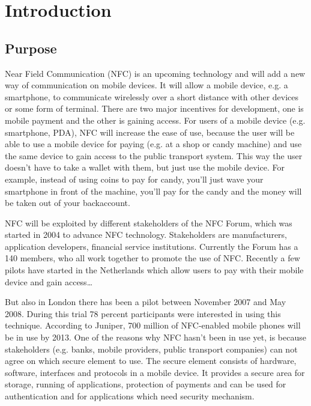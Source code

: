 \chapter{Introduction}

\section*{Purpose}

Near Field Communication (NFC)  is an upcoming technology and will add a new way of communication on mobile devices. It will allow a mobile device, e.g. a smartphone, to communicate wirelessly over a short distance with other devices or some form of terminal. There are two major incentives for development, one is mobile payment and the other is gaining access. For users of a mobile device (e.g. smartphone, PDA), NFC will increase the ease of use, because the user will be able to use a mobile device for paying (e.g. at a shop or candy machine) and use the same device to gain access to the public transport system. This way the user doesn't have to take a wallet with them, but just use the mobile device. For example, instead of using coins to pay for candy, you'll just wave your smartphone in front of the machine, you'll pay for the candy and the money will be taken out of your backaccount. 


NFC will be exploited by different stakeholders of the NFC Forum, which was started in 2004 to advance NFC technology. Stakeholders are manufacturers, application developers, financial service institutions. Currently the Forum has a 140 members, who all work together to promote the use of NFC. 
Recently a few pilots have started in the Netherlands which allow users to pay with their mobile device and gain access…%

But also in London there has been a pilot between November 2007 and May 2008. During this trial 78 percent participants were interested in using this technique. According to Juniper, 700 million of NFC-enabled mobile phones will be in use by 2013. 
One of the reasons why NFC hasn't been in use yet, is because stakeholders (e.g. banks, mobile providers, public transport companies) can not agree on which secure element to use. 
The secure element consists of hardware, software, interfaces and protocols in a mobile device. It provides a secure area for storage, running of applications, protection of payments and can be used for authentication  and for applications which need security mechanism.

